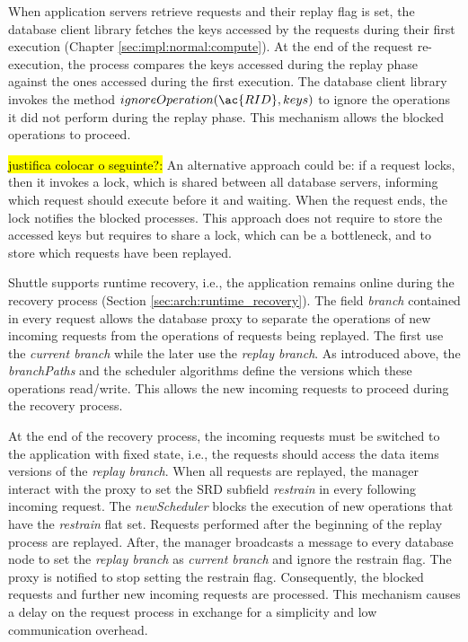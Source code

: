 When application servers retrieve requests and their replay flag is set, the database client library fetches the keys accessed by the requests during their first execution (Chapter \ref{sec:impl:normal:compute}). At the end of the request re-execution, the process compares the keys accessed during the replay phase against the ones accessed during the first execution. The database client library invokes the method $ignoreOperation(\ac{RID},keys)$ to ignore the operations it did not perform during the replay phase. This mechanism allows the blocked operations to proceed.


\hl{justifica colocar o seguinte?:} An alternative approach could be: if a request locks, then it invokes a lock, which is shared between all database servers, informing which request should execute before it and waiting. When the request ends, the lock notifies the blocked processes. This approach does not require to store the accessed keys but requires to share a lock, which can be a bottleneck, and to store which requests have been replayed. 


Shuttle supports runtime recovery, i.e., the application remains online during the recovery process (Section \ref{sec:arch:runtime_recovery}). The field \emph{branch} contained in every request allows the database proxy to separate the operations of new incoming requests from the operations of requests being replayed. The first use the \emph{current branch} while the later use the \emph{replay branch}. As introduced above, the \emph{branchPaths} and the scheduler algorithms define the versions which these operations read/write. This allows the new incoming requests to proceed during the recovery process.


At the end of the recovery process, the incoming requests must be switched to the application with fixed state, i.e., the requests should access the data items versions of the \emph{replay branch}. When all requests are replayed, the manager interact with the proxy to set the \ac{SRD} subfield \emph{restrain} in every following incoming request. The \emph{newScheduler} blocks the execution of new operations that have the \emph{restrain} flat set. Requests performed after the beginning of the replay process are replayed. After, the manager broadcasts a message to every database node to set the \emph{replay branch} as \emph{current branch} and ignore the restrain flag. The proxy is notified to stop setting the restrain flag. Consequently, the blocked requests and further new incoming requests are processed. This mechanism causes a delay on the request process in exchange for a simplicity and low communication overhead. 


